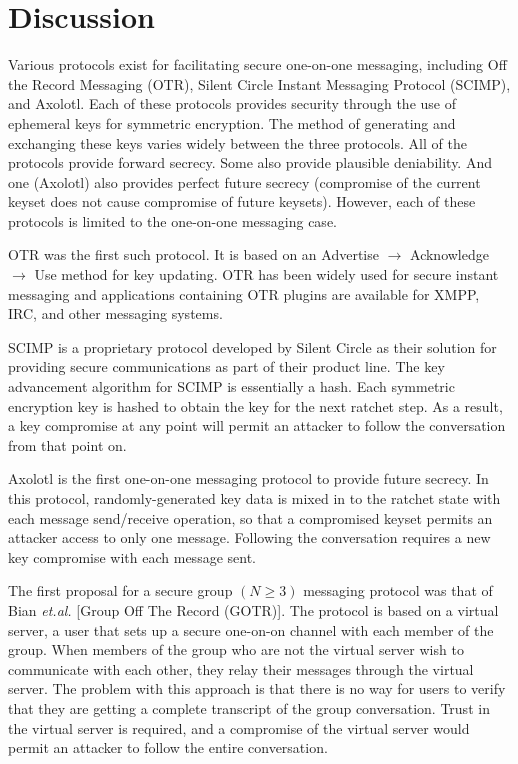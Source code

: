 \documentclass[%
preprint,
amsmath,amssymb,
aps,
prb,
floatfix,
]{revtex4-1}
\begin{document}
\section{\label{sec:discussion}Discussion}
Various protocols exist for facilitating secure one-on-one messaging, including
Off the Record Messaging (OTR)\cite{ref:otr1,ref:otr2,ref:otr3,ref:otr}, Silent Circle Instant Messaging Protocol
(SCIMP)\cite{ref:scimp}, and Axolotl\cite{ref:axolotl}. Each of these protocols
provides security through the use of ephemeral keys for symmetric encryption.
The method of generating and exchanging these keys varies widely between the
three protocols. All of the protocols provide forward
secrecy. Some also provide plausible deniability. And one (Axolotl) also
provides perfect future secrecy (compromise of the current keyset does not cause
compromise of future keysets). However, each of these protocols is limited to
the one-on-one messaging case.

OTR was the first such protocol. It is based on an Advertise $\rightarrow$
Acknowledge $\rightarrow$ Use method for key updating. OTR has been widely used
for secure instant messaging and applications containing OTR plugins are
available for XMPP, IRC, and other messaging systems.

SCIMP is a proprietary protocol developed by Silent Circle as their solution for
providing secure communications as part of their product line. The key
advancement algorithm for SCIMP is essentially a hash. Each symmetric encryption
key is hashed to obtain the key for the next ratchet step. As a result, a key
compromise at any point will permit an attacker to follow the conversation from
that point on.

Axolotl is the first one-on-one messaging protocol to provide future secrecy. In
this protocol, randomly-generated key data is mixed in to the ratchet state with
each message send/receive operation, so that a compromised keyset permits an
attacker access to only one message. Following the conversation requires a new
key compromise with each message sent.

The first proposal for a secure group $(N \ge 3)$ messaging protocol was that of
Bian \textit{et.al.}\cite{ref:bian} [Group Off The Record (GOTR)]. The protocol is based on a virtual server,
a user that sets up a secure one-on-on channel with each member of the group.
When members of the group who are not the virtual server wish to communicate
with each other, they relay their messages through the virtual server. The
problem with this approach is that there is no way for users to verify that they
are getting a complete transcript of the group conversation. Trust in the
virtual server is required, and a compromise of the virtual server would permit
an attacker to follow the entire conversation.
\end{document}
